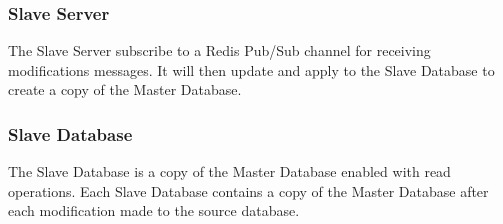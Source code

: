 \documentclass[a4paper,12pt]{report}
\begin{document}
\subsubsection{Slave Server}
The Slave Server subscribe to a Redis Pub/Sub channel for receiving modifications messages. It will then update and apply to the Slave Database to create a copy of the Master Database.

\subsubsection{Slave Database}
The Slave Database is a copy of the Master Database enabled with read operations. Each Slave Database contains a copy of the Master Database after each modification made to the source database.

\newpage
\end{document}
